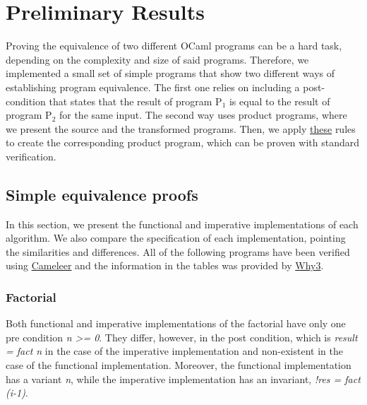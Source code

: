 
%

\chapter{Preliminary Results}
\label{cha:preliminary_results}

Proving the equivalence of two different OCaml programs can be a hard task, depending on the complexity and size of said programs.
Therefore, we implemented a small set of simple programs that show two different ways of establishing program equivalence.
The first one relies on including a post-condition that states that the result of program P$_1$ is equal to the result of program P$_2$ for the same input.
The second way uses product programs, where we present the source and the transformed programs.
Then, we apply \hyperref[fig:product_construction_equal_struct]{these} rules to create the corresponding product program, which can be proven with standard verification.


\section{Simple equivalence proofs}
\label{sec:results_eq_proofs}

In this section, we present the functional and imperative implementations of each algorithm.
We also compare the specification of each implementation, pointing the similarities and differences.
All of the following programs have been verified using \hyperref[sec:cameleer]{Cameleer} and the information in the tables was provided by \hyperref[sec:why3]{Why3}.


\subsection{Factorial}
\label{sub:factorial}

Both functional and imperative implementations of the factorial have only one pre condition \emph{n >= 0}.
They differ, however, in the post condition, which is \emph{result = fact n} in the case of the imperative implementation and non-existent in the case of the functional implementation.
Moreover, the functional implementation has a variant \emph{n}, while the imperative implementation has an invariant, \emph{!res = fact (i-1)}. 

